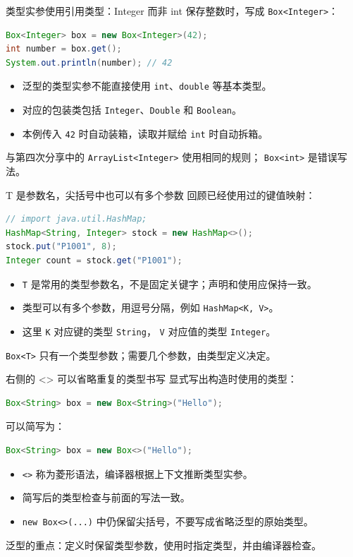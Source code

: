 \documentclass[aspectratio=169]{beamer}
\begin{document}
\begin{frame}[fragile]{类型实参使用引用类型：Integer 而非 int}
  保存整数时，写成 \texttt{Box<Integer>}：
  \begin{lstlisting}[language=Java]
Box<Integer> box = new Box<Integer>(42);
int number = box.get();
System.out.println(number); // 42
  \end{lstlisting}
  \begin{itemize}
    \item 泛型的类型实参不能直接使用 \texttt{int}、\texttt{double} 等基本类型。
    \item 对应的包装类包括 \texttt{Integer}、\texttt{Double} 和 \texttt{Boolean}。
    \item 本例传入 \texttt{42} 时自动装箱，读取并赋给 \texttt{int} 时自动拆箱。
  \end{itemize}
  \medskip
  与第四次分享中的 \texttt{ArrayList<Integer>} 使用相同的规则；
  \texttt{Box<int>} 是错误写法。
\end{frame}

\begin{frame}[fragile]{T 是参数名，尖括号中也可以有多个参数}
  回顾已经使用过的键值映射：
  \begin{lstlisting}[language=Java]
// import java.util.HashMap;
HashMap<String, Integer> stock = new HashMap<>();
stock.put("P1001", 8);
Integer count = stock.get("P1001");
  \end{lstlisting}
  \begin{itemize}
    \item \texttt{T} 是常用的类型参数名，不是固定关键字；声明和使用应保持一致。
    \item 类型可以有多个参数，用逗号分隔，例如 \texttt{HashMap<K, V>}。
    \item 这里 \texttt{K} 对应键的类型 \texttt{String}，
      \texttt{V} 对应值的类型 \texttt{Integer}。
  \end{itemize}
  \medskip
  \texttt{Box<T>} 只有一个类型参数；需要几个参数，由类型定义决定。
\end{frame}

\begin{frame}[fragile]{右侧的 <> 可以省略重复的类型书写}
  显式写出构造时使用的类型：
  \begin{lstlisting}[language=Java]
Box<String> box = new Box<String>("Hello");
  \end{lstlisting}
  可以简写为：
  \begin{lstlisting}[language=Java]
Box<String> box = new Box<>("Hello");
  \end{lstlisting}
  \begin{itemize}
    \item \texttt{<>} 称为菱形语法，编译器根据上下文推断类型实参。
    \item 简写后的类型检查与前面的写法一致。
    \item \texttt{new Box<>(...)} 中仍保留尖括号，不要写成省略泛型的原始类型。
  \end{itemize}
  \medskip
  泛型的重点：\alert{定义时保留类型参数，使用时指定类型，并由编译器检查}。
\end{frame}
\end{document}
